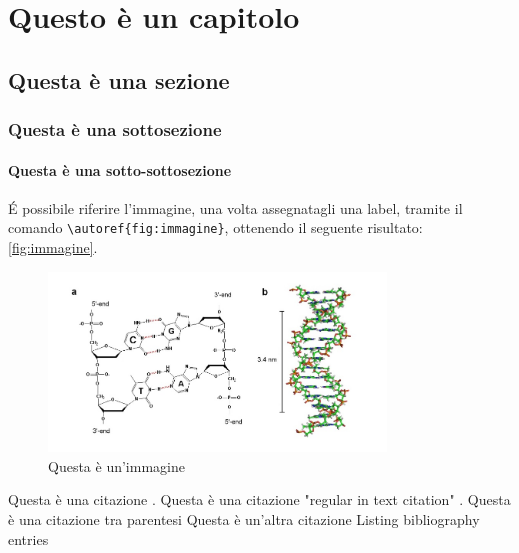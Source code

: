 \chapter{Questo è un capitolo}

\lipsum[1]

\section{Questa è una sezione}

\lipsum[2]

\subsection{Questa è una sottosezione}

\lipsum[3]

\subsubsection{Questa è una sotto-sottosezione}

\lipsum[4]

É possibile riferire l'immagine, una volta assegnatagli una label, tramite il comando \texttt{\textbackslash autoref\{fig:immagine\}}, ottenendo il seguente risultato: \autoref{fig:immagine}.

\begin{figure}
    \centering
    \includegraphics[width=0.8\textwidth]{images/Capitolo1/immagine.jpg} %
    \caption{Questa è un'immagine} 
    \label{fig:immagine} %
\end{figure}

Questa è una citazione \cite{warstadt2020blimp}.
Questa è una citazione "regular in text citation" \citet{warstadt2020blimp}.  %
Questa è una citazione tra parentesi \citep{warstadt2020blimp}
Questa è un'altra citazione \citep{wei2021frequency}
Listing bibliography entries \citep{chaves2014subject}

